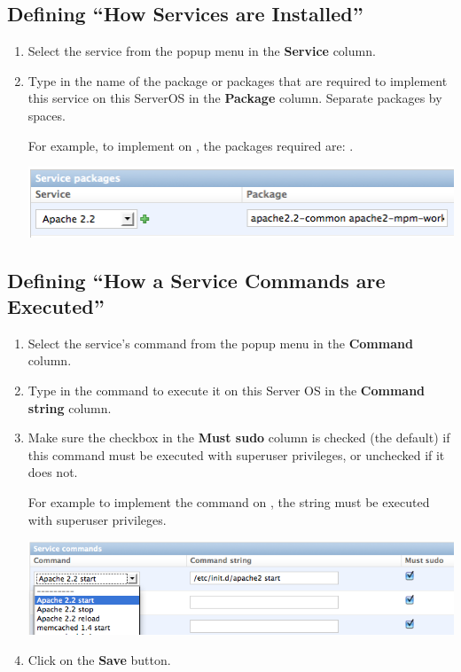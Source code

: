 \documentclass[letterpaper,10pt,english]{manual}
\begin{document}
\subsection{Defining ``How Services are Installed''}
\begin{enumerate}
\item {} 
Select the service from the popup menu in the \textbf{Service} column.

\item {} 
Type in the name of the package or packages that are required to implement this service on this ServerOS in the \textbf{Package} column. Separate packages by spaces.

For example, to implement  on , the packages required are: .

\includegraphics{add_service_package.png}

\end{enumerate}
\hypertarget{howaservicecommandsareexecuted}{}

\subsection{Defining ``How a Service Commands are Executed''}
\begin{enumerate}
\item {} 
Select the service's command from the popup menu in the \textbf{Command} column.

\item {} 
Type in the command to execute it on this Server OS in the \textbf{Command string} column.

\item {} 
Make sure the checkbox in the \textbf{Must sudo} column is checked (the default) if this command must be executed with superuser privileges, or unchecked if it does not.

For example to implement the  command on , the string  must be executed with superuser privileges.

\includegraphics{add_service_command.png}

\item {} 
Click on the \textbf{Save} button.

\end{enumerate}
\end{document}
